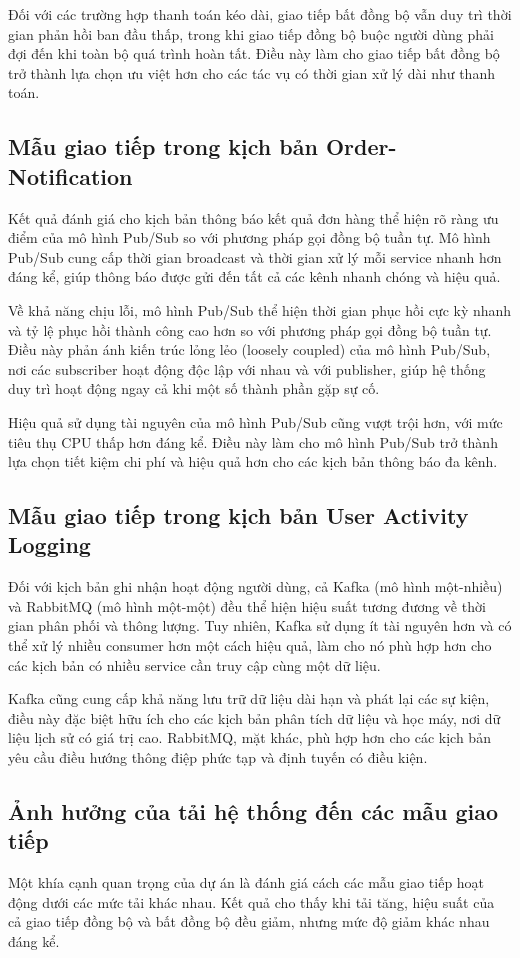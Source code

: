 Đối với các trường hợp thanh toán kéo dài, giao tiếp bất đồng bộ vẫn duy trì thời gian phản hồi ban đầu thấp, trong khi giao tiếp đồng bộ buộc người dùng phải đợi đến khi toàn bộ quá trình hoàn tất. Điều này làm cho giao tiếp bất đồng bộ trở thành lựa chọn ưu việt hơn cho các tác vụ có thời gian xử lý dài như thanh toán.

\subsection{Mẫu giao tiếp trong kịch bản Order-Notification}
Kết quả đánh giá cho kịch bản thông báo kết quả đơn hàng thể hiện rõ ràng ưu điểm của mô hình Pub/Sub so với phương pháp gọi đồng bộ tuần tự. Mô hình Pub/Sub cung cấp thời gian broadcast và thời gian xử lý mỗi service nhanh hơn đáng kể, giúp thông báo được gửi đến tất cả các kênh nhanh chóng và hiệu quả.

Về khả năng chịu lỗi, mô hình Pub/Sub thể hiện thời gian phục hồi cực kỳ nhanh và tỷ lệ phục hồi thành công cao hơn so với phương pháp gọi đồng bộ tuần tự. Điều này phản ánh kiến trúc lỏng lẻo (loosely coupled) của mô hình Pub/Sub, nơi các subscriber hoạt động độc lập với nhau và với publisher, giúp hệ thống duy trì hoạt động ngay cả khi một số thành phần gặp sự cố.

Hiệu quả sử dụng tài nguyên của mô hình Pub/Sub cũng vượt trội hơn, với mức tiêu thụ CPU thấp hơn đáng kể. Điều này làm cho mô hình Pub/Sub trở thành lựa chọn tiết kiệm chi phí và hiệu quả hơn cho các kịch bản thông báo đa kênh.

\subsection{Mẫu giao tiếp trong kịch bản User Activity Logging}
Đối với kịch bản ghi nhận hoạt động người dùng, cả Kafka (mô hình một-nhiều) và RabbitMQ (mô hình một-một) đều thể hiện hiệu suất tương đương về thời gian phân phối và thông lượng. Tuy nhiên, Kafka sử dụng ít tài nguyên hơn và có thể xử lý nhiều consumer hơn một cách hiệu quả, làm cho nó phù hợp hơn cho các kịch bản có nhiều service cần truy cập cùng một dữ liệu.

Kafka cũng cung cấp khả năng lưu trữ dữ liệu dài hạn và phát lại các sự kiện, điều này đặc biệt hữu ích cho các kịch bản phân tích dữ liệu và học máy, nơi dữ liệu lịch sử có giá trị cao. RabbitMQ, mặt khác, phù hợp hơn cho các kịch bản yêu cầu điều hướng thông điệp phức tạp và định tuyến có điều kiện.

\subsection{Ảnh hưởng của tải hệ thống đến các mẫu giao tiếp}
Một khía cạnh quan trọng của dự án là đánh giá cách các mẫu giao tiếp hoạt động dưới các mức tải khác nhau. Kết quả cho thấy khi tải tăng, hiệu suất của cả giao tiếp đồng bộ và bất đồng bộ đều giảm, nhưng mức độ giảm khác nhau đáng kể.

